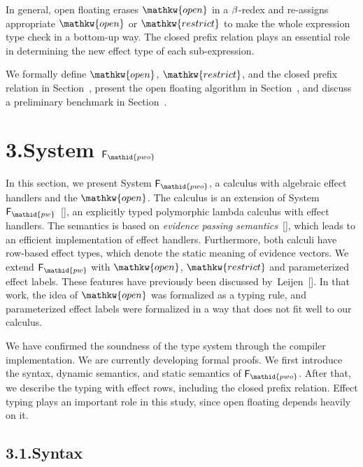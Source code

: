 \documentclass{llncs}
\begin{document}
In general, open floating erases $\mathpre{\mathkw{open}}$ in a $\mathpre{\beta{}}$-redex and
re-assigns appropriate $\mathpre{\mathkw{open}}$ or $\mathpre{\mathkw{restrict}}$ to make the whole expression type check in a bottom-up way.
The closed prefix relation plays an essential role in determining the new effect type of each sub-expression.

We formally define $\mathpre{\mathkw{open}}$, $\mathpre{\mathkw{restrict}}$, and the closed prefix relation in Section~,
present the open floating algorithm in Section~, and discuss a preliminary benchmark in Section~.%


\section{3.\hspace*{0.5em}System $\mathpre{\mathsf{F}_{\mathid{pwo}}}$}%

\noindent In this section, we present System $\mathpre{\mathsf{F}_{\mathid{pwo}}}$, a calculus with algebraic effect handlers and the $\mathpre{\mathkw{open}}$.
The calculus is an extension of System $\mathpre{\mathsf{F}_{\mathid{pw}}}$~[], an explicitly typed polymorphic lambda calculus with effect handlers.
The semantics is based on \emph{evidence passing semantics}~[], which leads to an efficient implementation of effect handlers.
Furthermore, both calculi have row-based effect types, which denote the static meaning of evidence vectors.
We extend $\mathpre{\mathsf{F}_{\mathid{pw}}}$ with $\mathpre{\mathkw{open}}$, $\mathpre{\mathkw{restrict}}$ and parameterized effect labels.
These features have previously been discussed by~Leijen~[].
In that work, the idea of $\mathpre{\mathkw{open}}$ was formalized as a typing rule,
and parameterized effect labels were formalized in a way that does not fit well
to our calculus.%

We have confirmed the soundness of the type system through the compiler implementation.
We are currently developing formal proofs.
We first introduce the syntax, dynamic semantics, and static semantics of $\mathpre{\mathsf{F}_{\mathid{pwo}}}$.
After that, we describe the typing with effect rows, including the closed prefix relation.
Effect typing plays an important role in this study,
since open floating depends heavily on it.%

\subsection{3.1.\hspace*{0.5em}Syntax}%
\end{document}
